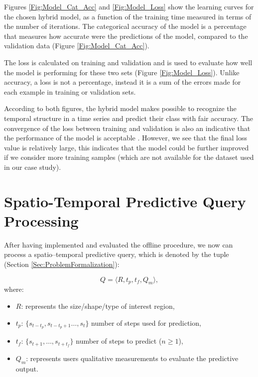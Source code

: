 Figures \ref{Fig:Model_Cat_Acc} and \ref{Fig:Model_Loss} show the learning curves for the chosen hybrid model, as a function of the training time measured in terms of the number of iterations. The categorical accuracy of the model is a percentage that measures how accurate were the predictions of the model, compared to the validation data (Figure \ref{Fig:Model_Cat_Acc}).  

The loss is calculated on training and validation and is used to evaluate how well the model is performing for these two sets (Figure \ref{Fig:Model_Loss}). Unlike accuracy, a loss is not a percentage, instead it is a sum of the errors made for each example in training or validation sets.

According to both figures, the hybrid model makes possible to recognize the temporal structure in a time series and predict their class with fair accuracy. The convergence of the loss between training and validation is also an indicative that the performance of the model is acceptable \cite{Charniak2019}. However, we see that the final loss value is relatively large, this indicates that the model could be further improved if we consider more training samples (which are not available for the dataset used in our case study).

\section{Spatio-Temporal Predictive Query Processing}
\label{Sec:SpatioTemporalPredictiveQuery}

After having implemented and evaluated the offline procedure, we now can process a spatio--temporal predictive query, which is denoted by the tuple (Section \ref{Sec:ProblemFormalization}):

\begin{equation*} 
Q = \langle R, t_{p}, t_{f}, Q_{m} \rangle,
\end{equation*}
where:
\begin{itemize}[noitemsep,nolistsep]	
	\item $R$: represents the size/shape/type of interest region,
	\item $t_{p}$: $\{s_{t-t_p}, s_{t-t_{p}+1}\ldots, s_{t}\}$ number of steps used for  prediction,
	\item $t_{f}$: $\{s_{t+1}, \ldots, s_{t+t_f}\}$ number of steps to predict ($n\geq 1$),
	\item $Q_{m}$: represents users qualitative measurements to evaluate the predictive output.
\end{itemize}

